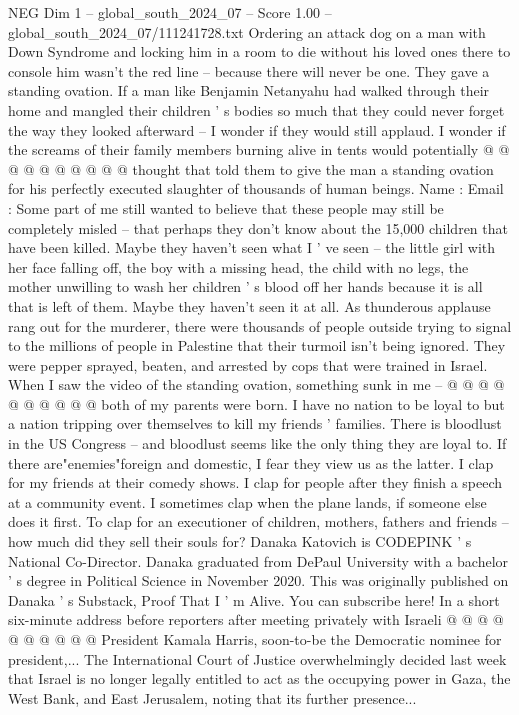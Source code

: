 \begin{textsample}{NEG Dim 1 – global\_south\_2024\_07 – Score 1.00 – global\_south\_2024\_07/111241728.txt}
Ordering an attack dog on a man with Down Syndrome and locking him in a room to die without his loved ones there to console him wasn't the red line -- because there will never be one.
They gave a standing ovation.
If a man like Benjamin Netanyahu had walked through their home and mangled their children ' s bodies so much that they could never forget the way they looked afterward -- I wonder if they would still applaud.
I wonder if the screams of their family members burning alive in tents would potentially @ @ @ @ @ @ @ @ @ @ thought that told them to give the man a standing ovation for his perfectly executed slaughter of thousands of human beings.
Name : Email : Some part of me still wanted to believe that these people may still be completely misled -- that perhaps they don't know about the 15,000 children that have been killed.
Maybe they haven't seen what I ' ve seen -- the little girl with her face falling off, the boy with a missing head, the child with no legs, the mother unwilling to wash her children ' s blood off her hands because it is all that is left of them.
Maybe they haven't seen it at all.
As thunderous applause rang out for the murderer, there were thousands of people outside trying to signal to the millions of people in Palestine that their turmoil isn't being ignored.
They were pepper sprayed, beaten, and arrested by cops that were trained in Israel.
When I saw the video of the standing ovation, something sunk in me -- @ @ @ @ @ @ @ @ @ @ both of my parents were born.
I have no nation to be loyal to but a nation tripping over themselves to kill my friends ' families.
There is bloodlust in the US Congress -- and bloodlust seems like the only thing they are loyal to.
If there are"enemies"foreign and domestic, I fear they view us as the latter.
I clap for my friends at their comedy shows.
I clap for people after they finish a speech at a community event.
I sometimes clap when the plane lands, if someone else does it first.
To clap for an executioner of children, mothers, fathers and friends -- how much did they sell their souls for?
Danaka Katovich is CODEPINK ' s National Co-Director.
Danaka graduated from DePaul University with a bachelor ' s degree in Political Science in November 2020.
This was originally published on Danaka ' s Substack, Proof That I ' m Alive.
You can subscribe here!
In a short six-minute address before reporters after meeting privately with Israeli @ @ @ @ @ @ @ @ @ @ President Kamala Harris, soon-to-be the Democratic nominee for president,...
The International Court of Justice overwhelmingly decided last week that Israel is no longer legally entitled to act as the occupying power in Gaza, the West Bank, and East Jerusalem, noting that its further presence...

\end{textsample}
